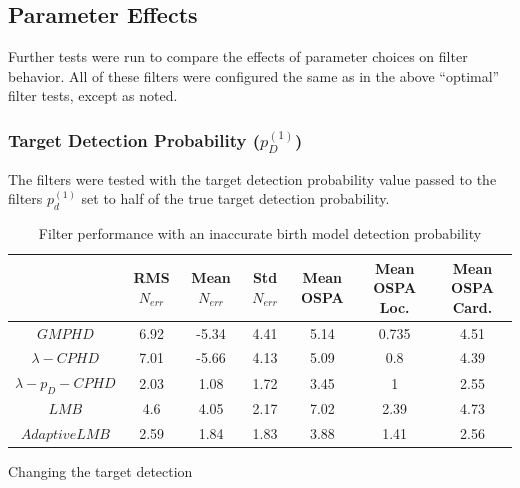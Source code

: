 \documentclass{article}
\newcommand{\tgt}{{(1)}}
\begin{document}
\subsection{Parameter Effects}
Further tests were run to compare the effects of parameter choices on filter behavior. All of these filters were configured the same as in the above ``optimal'' filter tests, except as noted.
\subsubsection{Target Detection Probability ($p_D^\tgt$)}
The filters were tested with the target detection probability value passed to the filters $p_d^\tgt$ set to half of the true target detection probability.
\begin{table}[H]
  \centering
  \begin{tabular}{ c| c | c | c | c | c | c }
    & RMS $N_{err}$ & Mean $N_{err}$ & Std $N_{err}$ & Mean OSPA & Mean OSPA Loc. & Mean OSPA Card.\\
    \hline
    $GMPHD$ & 6.92 & -5.34 & 4.41 & 5.14 & 0.735 & 4.51 \\
    $\lambda-CPHD$ & 7.01 & -5.66 & 4.13 & 5.09 & 0.8 & 4.39 \\
    $\lambda-p_D-CPHD$ & 2.03 & 1.08 & 1.72 & 3.45 & 1 & 2.55 \\
    $LMB$ & 4.6 & 4.05 & 2.17 & 7.02 & 2.39 & 4.73 \\
    $Adaptive LMB$ & 2.59 & 1.84 & 1.83 & 3.88 & 1.41 & 2.56 \\
  \end{tabular}
  \caption{Filter performance with an inaccurate birth model detection probability}
  \label{tab:low_pd}
\end{table}
Changing the target detection 
\end{document}
